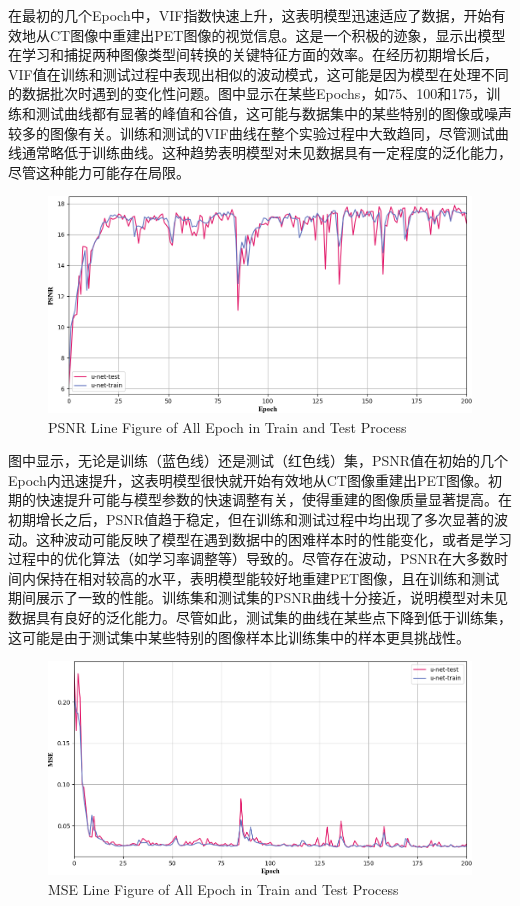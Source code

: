 \documentclass[twocolumn]{article}
\begin{document}
在最初的几个Epoch中，VIF指数快速上升，这表明模型迅速适应了数据，开始有效地从CT图像中重建出PET图像的视觉信息。这是一个积极的迹象，显示出模型在学习和捕捉两种图像类型间转换的关键特征方面的效率。在经历初期增长后，VIF值在训练和测试过程中表现出相似的波动模式，这可能是因为模型在处理不同的数据批次时遇到的变化性问题。图中显示在某些Epochs，如75、100和175，训练和测试曲线都有显著的峰值和谷值，这可能与数据集中的某些特别的图像或噪声较多的图像有关。训练和测试的VIF曲线在整个实验过程中大致趋同，尽管测试曲线通常略低于训练曲线。这种趋势表明模型对未见数据具有一定程度的泛化能力，尽管这种能力可能存在局限。

\begin{figure}[h]
    \centering
    \includegraphics[width=1.0\linewidth]{u-net/PSNR}
    \caption[psnr]{PSNR Line Figure of All Epoch in Train and Test Process}
    \label{fig:psnr}
\end{figure}

图中显示，无论是训练（蓝色线）还是测试（红色线）集，PSNR值在初始的几个Epoch内迅速提升，这表明模型很快就开始有效地从CT图像重建出PET图像。初期的快速提升可能与模型参数的快速调整有关，使得重建的图像质量显著提高。在初期增长之后，PSNR值趋于稳定，但在训练和测试过程中均出现了多次显著的波动。这种波动可能反映了模型在遇到数据中的困难样本时的性能变化，或者是学习过程中的优化算法（如学习率调整等）导致的。尽管存在波动，PSNR在大多数时间内保持在相对较高的水平，表明模型能较好地重建PET图像，且在训练和测试期间展示了一致的性能。训练集和测试集的PSNR曲线十分接近，说明模型对未见数据具有良好的泛化能力。尽管如此，测试集的曲线在某些点下降到低于训练集，这可能是由于测试集中某些特别的图像样本比训练集中的样本更具挑战性。

\begin{figure}[h]
    \centering
    \includegraphics[width=1.0\linewidth]{u-net/MSE}
    \caption[mse]{MSE Line Figure of All Epoch in Train and Test Process}
    \label{fig:mse}
\end{figure}
\end{document}
